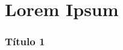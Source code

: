 \section{Lorem Ipsum} \label{FormProb}

\begin{frame}[c]\frametitle{Título 1}

    \lipsum

\end{frame}
